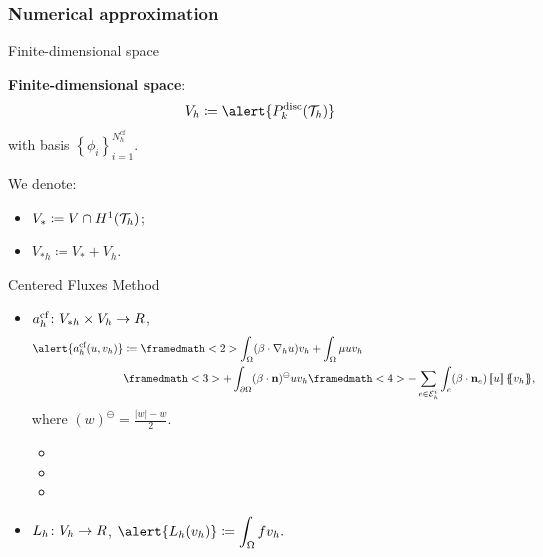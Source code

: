 	\subsubsection{Numerical approximation}
	
	\begin{frame}{Finite-dimensional space}
	
	\textbf{Finite-dimensional space}: $$V_h\coloneqq\alert{\Pd_k(\T_h)}$$ with basis $\left\{\phi_i\right\}_{i=1}^{N_h^{\text{cf}}}$.
	\vspace*{1cm}
	
	We denote:
	\begin{itemize}
		\item $V_*\coloneqq V\cap H^1(\mathcal{T}_h)$;
		\item $V_{*h}\coloneqq V_*+V_h$.
	\end{itemize}
	\end{frame}
	
	\begin{frame}{Centered Fluxes Method}
	\begin{itemize}\itemsep1em
		\item $a_h^{\text{cf}}\colon V_{*h}\times V_h\to\relax R$,
		\begin{align*}
		\alert{\acf{u}{v_h}}&\coloneqq\framedmath<2>{\displaystyle \int_\Omega(\beta\cdot\nabla_h u)v_h+\int_\Omega\mu u v_h}\\&\framedmath<3>{\displaystyle +\int_{\partial\Omega}(\beta\cdot\mathbf{n})^\ominus uv_h}\framedmath<4>{\displaystyle -\sum_{e\in\E_h^i}\int_e(\beta\cdot\mathbf{n}_e)\salto{u}\media{v_h}},
		\end{align*}
		where $(w)^\ominus=\frac{\vert w\vert - w}{2}$.
		\vspace*{0.3cm}
		\begin{itemize}
			\item<2> 
			\item<3> 
			\item<4> 
		\end{itemize}
		\item $L_h\colon V_h\to\relax R$, $\displaystyle \alert{L_h(v_h)}\coloneqq\int_\Omega f v_h.$
	\end{itemize}
\end{frame}

